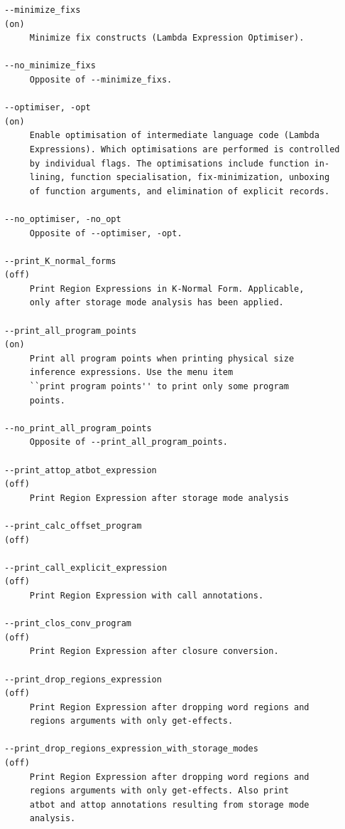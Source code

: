 \documentclass[12pt]{book}
\begin{document}
{\begin{verbatim}
--minimize_fixs                                                      (on)
     Minimize fix constructs (Lambda Expression Optimiser).

--no_minimize_fixs
     Opposite of --minimize_fixs.

--optimiser, -opt                                                    (on)
     Enable optimisation of intermediate language code (Lambda
     Expressions). Which optimisations are performed is controlled
     by individual flags. The optimisations include function in-
     lining, function specialisation, fix-minimization, unboxing
     of function arguments, and elimination of explicit records.

--no_optimiser, -no_opt
     Opposite of --optimiser, -opt.

--print_K_normal_forms                                              (off)
     Print Region Expressions in K-Normal Form. Applicable,
     only after storage mode analysis has been applied.

--print_all_program_points                                           (on)
     Print all program points when printing physical size
     inference expressions. Use the menu item
     ``print program points'' to print only some program
     points.

--no_print_all_program_points
     Opposite of --print_all_program_points.

--print_attop_atbot_expression                                      (off)
     Print Region Expression after storage mode analysis

--print_calc_offset_program                                         (off)

--print_call_explicit_expression                                    (off)
     Print Region Expression with call annotations.

--print_clos_conv_program                                           (off)
     Print Region Expression after closure conversion.

--print_drop_regions_expression                                     (off)
     Print Region Expression after dropping word regions and
     regions arguments with only get-effects.

--print_drop_regions_expression_with_storage_modes                  (off)
     Print Region Expression after dropping word regions and
     regions arguments with only get-effects. Also print
     atbot and attop annotations resulting from storage mode
     analysis.


\end{verbatim}}
\end{document}
